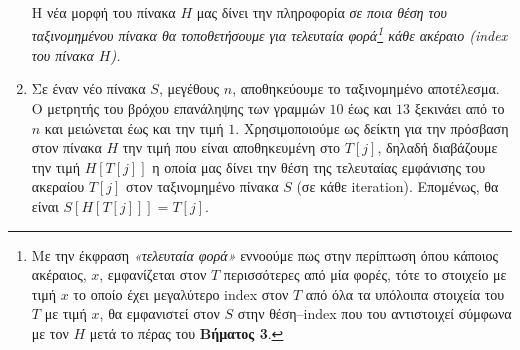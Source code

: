 \begin{enumerate}[label=\textbf{Βήμα \arabic*.}]
\begin{center}
		\end{center}
		Η νέα μορφή του πίνακα $H$ μας δίνει την πληροφορία \textsl{σε ποια θέση του ταξινομημένου πίνακα θα τοποθετήσουμε για τελευταία φορά\footnote{Με την έκφραση \textsl{«τελευταία φορά»} εννοούμε πως στην περίπτωση όπου κάποιος ακέραιος, $x$, εμφανίζεται στον $T$ περισσότερες από μία φορές, τότε το στοιχείο με τιμή $x$ το οποίο έχει μεγαλύτερο index στον $T$ από όλα τα υπόλοιπα στοιχεία του $T$ με τιμή $x$, θα εμφανιστεί στον $S$ στην θέση--index που του αντιστοιχεί σύμφωνα με τον $H$ μετά το πέρας του \textbf{Βήματος 3}.} κάθε ακέραιο (index του πίνακα $H$).}\newpage
	\item Σε έναν νέο πίνακα $S$, μεγέθους $n$, αποθηκεύουμε το ταξινομημένο αποτέλεσμα. Ο μετρητής του βρόχου επανάληψης των γραμμών $10$ έως και $13$ ξεκινάει από το $n$ και μειώνεται έως και την τιμή $1$. Χρησιμοποιούμε ως δείκτη για την πρόσβαση στον πίνακα $H$ την τιμή που είναι αποθηκευμένη στο $T[j]$, δηλαδή διαβάζουμε την τιμή $H[T[j]]$ η οποία μας δίνει την θέση της τελευταίας εμφάνισης του ακεραίου $T[j]$ στον ταξινομημένο πίνακα $S$ (σε κάθε iteration). Επομένως, θα είναι $S[H[T[j]]]=T[j]$.


\end{enumerate}
